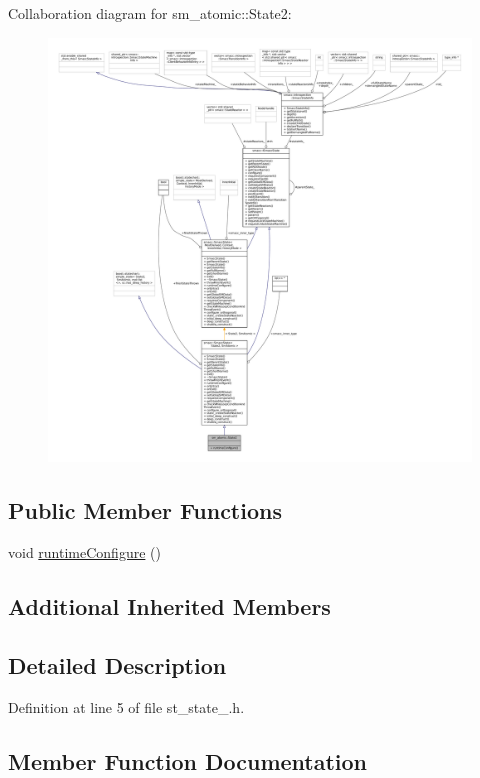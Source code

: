 Collaboration diagram for sm\+\_\+atomic\+:\+:State2\+:
\nopagebreak
\begin{figure}[H]
\begin{center}
\leavevmode
\includegraphics[width=350pt]{structsm__atomic_1_1State2__coll__graph}
\end{center}
\end{figure}
\subsection*{Public Member Functions}
\begin{DoxyCompactItemize}
\item 
void \hyperlink{structsm__atomic_1_1State2_afd749890e13d8aa36f1ac6645a5f7f9a}{runtime\+Configure} ()
\end{DoxyCompactItemize}
\subsection*{Additional Inherited Members}


\subsection{Detailed Description}


Definition at line 5 of file st\+\_\+state\+\_.\+h.



\subsection{Member Function Documentation}
